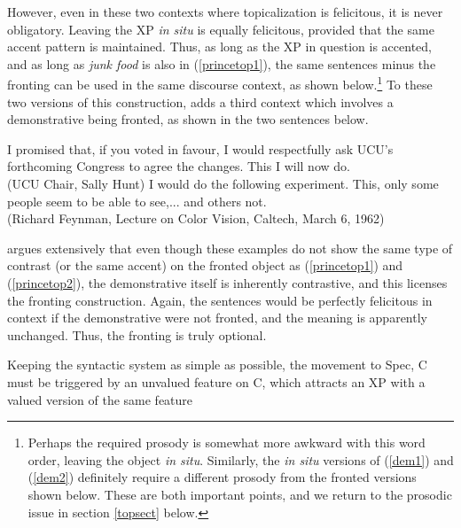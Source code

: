However, even in these two contexts where topicalization is felicitous, it is never obligatory. Leaving the XP \textsl{in situ} is equally felicitous, provided that the same accent pattern is maintained. Thus, as long as the XP in question is accented, and as long as \textsl{junk food} is also in (\ref{princetop1}), the same sentences minus the fronting can be used in the same discourse context, as shown below.\footnote{Perhaps the required prosody is somewhat more awkward with this word order, leaving the object \textsl{in situ}. Similarly, the \textsl{in situ} versions of (\ref{dem1}) and (\ref{dem2}) definitely require a different prosody from the fronted versions shown below. These are both important points, and we return to the prosodic issue in section \ref{topsect} below.} To these two versions of this construction, \citet{caitldiss} adds a third context which involves a demonstrative being fronted, as shown in the two sentences below. 

\begin{exe}
\ex \label{dem1} I promised that, if you voted in favour, I would respectfully ask UCU's forthcoming Congress to agree the changes. This I will now do.\\
(UCU Chair, Sally Hunt)
\ex \label{dem2} I would do the following experiment. This, only some people seem to be able to see,... and others not.\\
(Richard Feynman, Lecture on Color Vision, Caltech, March 6, 1962)
\end{exe}

\noindent \citet{caitldiss} argues extensively that even though these examples do not show the same type of contrast (or the same accent) on the fronted object as (\ref{princetop1}) and (\ref{princetop2}), the demonstrative itself is inherently contrastive, and this licenses the fronting construction. Again, the sentences would be perfectly felicitous in context if the demonstrative were not fronted, and the meaning is apparently unchanged. Thus, the fronting is truly optional.

Keeping the syntactic system as simple as possible, the movement to Spec, C must be triggered by an unvalued feature on C, which attracts an XP with a valued version of the same feature



